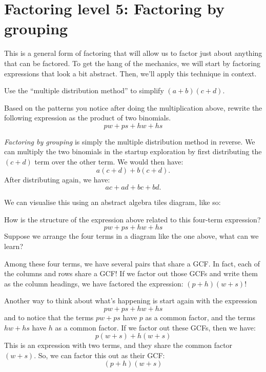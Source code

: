 \section{Factoring level 5: Factoring by grouping}

This is a general form of factoring that will allow us to factor just about anything that can be factored. To get the hang of the mechanics, we will start by factoring expressions that look a bit abstract. Then, we'll apply this technique in context.
 
\begin{boxedexplore}
Use the ``multiple distribution method'' to simplify $(a+b)(c+d)$.

Based on the patterns you notice after doing the multiplication above, rewrite the following expression as the product of two binomials.
\[pw + ps + hw + hs\]
\end{boxedexplore}

\textit{Factoring by grouping} is simply the multiple distribution method in reverse. We can multiply the two binomials in the startup exploration by first distributing the $(c+d)$ term over the other term. We would then have:
\[a (c + d) + b (c + d).\]
After distributing again, we have:
\[ac +ad + bc + bd.\]

We can visualise this using an abstract algebra tiles diagram, like so:

How is the structure of the expression above related to this four-term expression?
\[pw + ps + hw + hs\]
Suppose we arrange the four terms in a diagram like the one above, what can we learn?

Among these four terms, we have several pairs that share a GCF. In fact, each of the columns and rows share a GCF! If we factor out those GCFs and write them as the column headings, we have factored the expression: $(p+h)(w+s)$!

Another way to think about what's happening is start again with the expression
\[pw + ps + hw + hs\]
and to notice that the terms $pw + ps$ have $p$ as a common factor, and the terms $hw+hs$ have $h$ as a common factor. If we factor out these GCFs, then we have:
\[p(w+s) + h(w+s)\]
This is an expression with two terms, and they share the common factor $(w+s)$. So, we can factor this out as their GCF:
\[(p+h)(w+s)\]




